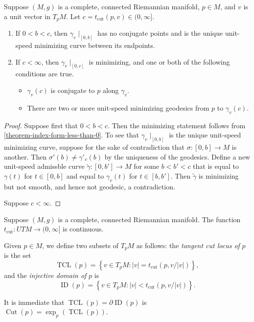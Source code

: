 \begin{proposition}
  \label{proposition-properties-of-cut-times}
  Suppose \( (M, g) \) is a complete, connected Riemannian manifold, \( p \in M \), and \( v \) is a unit vector in \( T_p M \).
  Let \( c = t_{\text{cut}}(p, v) \in (0, \infty] \).
  \begin{enumerate}
    \item If \( 0 < b < c \), then \( \gamma_v \mid_{[0, b]} \) has no conjugate points and is the unique unit-speed minimizing curve between its endpoints.
    \item If \( c < \infty \), then \( \gamma_v \mid_{[0, c]} \) is minimizing, and one or both of the following conditions are true.
      \begin{itemize}
        \item \( \gamma_v(c) \) is conjugate to \( p \) along \( \gamma_v \).
        \item There are two or more unit-speed minimizing geodesics from \( p \) to \( \gamma_v(c) \).
      \end{itemize}
  \end{enumerate}
\end{proposition}
\begin{proof}
  Suppose first that \( 0 < b < c \).
  Then the minimizing statement follows from \ref{theorem-index-form-less-than-0}.
  To see that \( \gamma_v \mid_{[0, b]} \) is the unique unit-speed minimizing curve, suppose for the sake of contradiction that \( \sigma: [0, b] \to M \) is another.
  Then \( \sigma'(b) \neq \gamma'_v(b) \) by the uniqueness of the geodesics.
  Define a new unit-speed admissble curve \( \tilde{\gamma}: [0, b'] \to M \) for some \( b < b' < c \) that is equal to \( \gamma(t) \) for \( t \in [0, b] \) and equal to \( \gamma_v(t) \) for \( t \in [b, b'] \).
  Then \( \tilde{\gamma} \) is minimizing but not smooth, and hence not geodesic, a contradiction.

  Suppose \( c < \infty \).
\end{proof}

\begin{theorem}
  \label{theorem-cut-function-is-continuous}
  Suppose \( (M, g) \) is a complete, connected Riemannian manifold.
  The function \( t_{\text{cut}}: UTM \to (0, \infty] \) is continuous.
\end{theorem}

\begin{definition}
  \label{definition-tangent-cut-locus}
  Given \( p \in M \), we define two subsets of \( T_p M \) as follows: the \emph{tangent cut locus of} \( p \) is the set
  \[
    \operatorname{TCL}(p) = \left\lbrace v \in T_p M: \left\lvert v \right\rvert = t_{\text{cut}}(p , v / \left\lvert v \right\rvert) \right\rbrace,
  \]
  and the \emph{injective domain of} \( p \) is
  \[
    \operatorname{ID}(p) = \left\lbrace v \in T_p M: \left\lvert v \right\rvert < t_{\text{cut}}(p, v / \left\lvert v \right\rvert) \right\rbrace.
  \]
\end{definition}
It is immediate that \( \operatorname{TCL}(p) = \partial \operatorname{ID}(p) \) is \( \operatorname{Cut}(p) = \exp_p(\operatorname{TCL}(p)) \).

